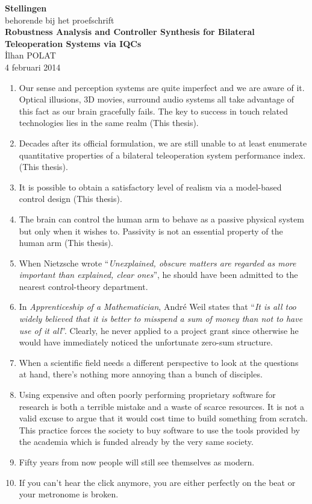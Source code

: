\documentclass[10pt]{article}%
\newcommand{\mystelling}[1]{%
\item #1
}
\begin{document}
\vspace*{1.5cm}
\begin{center}
{\LARGE \bfseries Stellingen}\\[5mm]
{\Large behorende bij het proefschrift}\\[2cm]
{\LARGE \bfseries Robustness Analysis and Controller Synthesis for Bilateral Teleoperation Systems via IQCs}\\[4mm]
\vspace{2cm}
{\Large \.Ilhan POLAT \\[1cm]
4 februari 2014}
\end{center}
%
\newpage
%
%
\begin{enumerate}
\mystelling{Our sense and perception systems are quite imperfect and we are aware of it. Optical illusions, 
3D movies, surround audio systems all take advantage of this fact as our brain gracefully fails. The key to success 
in touch related technologies lies in the same realm (This thesis).} 
\mystelling{Decades after its official formulation, we are still unable to at least enumerate quantitative 
properties of a bilateral teleoperation system performance index. (This thesis).}
\mystelling{It is possible to obtain a satisfactory level of realism via a model-based control design (This thesis).}
\mystelling{The brain can control the human arm to behave as a passive physical system but only when it 
wishes to. Passivity is not an essential property of the human arm (This thesis).}
\mystelling{When Nietzsche wrote \enquote{\emph{Unexplained, obscure matters are regarded 
as more important than explained, clear ones}}, he should have been admitted to the 
nearest control-theory department.}
\mystelling{In \emph{Apprenticeship of a Mathematician}, Andr\'{e} Weil states that 
\enquote{\emph{It is all too widely believed that it is better to misspend a sum of 
money than not to have use of it all}}. Clearly, he never applied to a project grant
since otherwise he would have immediately noticed the unfortunate zero-sum structure.
}
\mystelling{When a scientific field needs a different perspective to look at the questions 
at hand, there's nothing more annoying than a bunch of disciples.}
\mystelling{Using expensive and often poorly performing proprietary software for research 
is both a terrible mistake and a waste of scarce resources. It is not a valid excuse to 
argue that it would cost time to build something from scratch. This practice forces the
society to buy software to use the tools provided by the academia which is funded already by 
the very same society.}
\mystelling{Fifty years from now people will still see themselves as modern.}
\mystelling{If you can't hear the click anymore, you are either perfectly on the beat or your metronome is broken.}
%
\end{enumerate}
\end{document}
